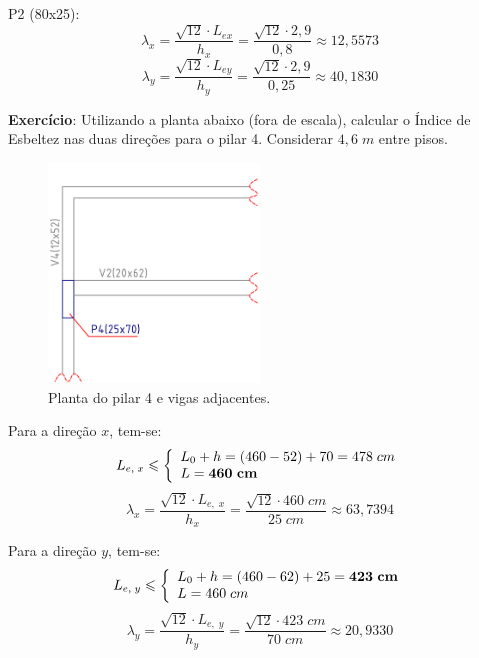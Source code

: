 P2 (80x25):
$$\lambda_x=\frac{\sqrt{12}\cdot L_{ex}}{h_x}=\frac{\sqrt{12}\cdot2,9}{0,8}\approx12,5573$$
$$\lambda_y=\frac{\sqrt{12}\cdot L_{ey}}{h_y}=\frac{\sqrt{12}\cdot2,9}{0,25}\approx40,1830$$

\textbf{Exercício}: Utilizando a planta abaixo (fora de escala), calcular o Índice de Esbeltez nas duas direções para o pilar 4. Considerar $4,6\;m$ entre pisos.

\begin{figure}[H]
	\begin{center}
	\caption{Planta do pilar 4 e vigas adjacentes.}
    	\includegraphics[width=0.5\textwidth]{Indice-de-esbeltez/Imagens/Exercicio-Indice-de-Esbeltez.png}
	\end{center}
\end{figure}

 Para a direção $x$, tem-se:
$$
	L_{e,\;x}\leqslant\left\{
		\begin{array}{ll}
		L_0+h=(460-52)+70=478\;cm \\
		L=\textbf{460\;cm}
		\end{array}\right.
$$
$$\lambda_x=\frac{\sqrt{12}\cdot L_{e,\;x}}{h_x}=\frac{\sqrt{12}\cdot 460\;cm}{25\;cm}\approx63,7394$$

Para a direção $y$, tem-se:
$$
	L_{e,\;y}\leqslant\left\{
		\begin{array}{ll}
		L_0+h=(460-62)+25=\textbf{423\;cm} \\
		L=460\;cm
		\end{array}\right.
$$
$$\lambda_y=\frac{\sqrt{12}\cdot L_{e,\;y}}{h_y}=\frac{\sqrt{12}\cdot 423\;cm}{70\;cm}\approx20,9330$$
